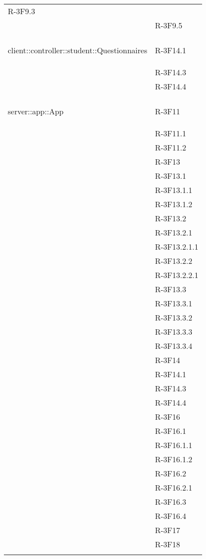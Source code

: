 \begin{longtable}{l p{3cm}}
	R-3F9.3 \tabularnewline &
	
	R-3F9.5 \tabularnewline &\tabularnewline
	\hline
	\hypertarget{client::controller::student::Questionnaires}{client::controller::student::Questionnaires} & R-3F14.1 \tabularnewline &
	
	R-3F14.3 \tabularnewline &
	
	R-3F14.4 \tabularnewline &\tabularnewline
	\hline
	\hypertarget{server::app::App}{server::app::App} & R-3F11 \tabularnewline &
	
	R-3F11.1 \tabularnewline &
	
	R-3F11.2 \tabularnewline &
	
	R-3F13 \tabularnewline &
	
	R-3F13.1 \tabularnewline &
	
	R-3F13.1.1 \tabularnewline &
	
	R-3F13.1.2 \tabularnewline &
	
	R-3F13.2 \tabularnewline &
	
	R-3F13.2.1 \tabularnewline &
	
	R-3F13.2.1.1 \tabularnewline &
	
	R-3F13.2.2 \tabularnewline &
	
	R-3F13.2.2.1 \tabularnewline &
	
	R-3F13.3 \tabularnewline &
	
	R-3F13.3.1 \tabularnewline &
	
	R-3F13.3.2 \tabularnewline &
	
	R-3F13.3.3 \tabularnewline &
	
	R-3F13.3.4 \tabularnewline &
	
	R-3F14 \tabularnewline &
	
	R-3F14.1 \tabularnewline &
	
	R-3F14.3 \tabularnewline &
	
	R-3F14.4 \tabularnewline &
	
	R-3F16 \tabularnewline &
	
	R-3F16.1 \tabularnewline &
	
	R-3F16.1.1 \tabularnewline &
	
	R-3F16.1.2 \tabularnewline &
	
	R-3F16.2 \tabularnewline &
	
	R-3F16.2.1 \tabularnewline &
	
	R-3F16.3 \tabularnewline &
	
	R-3F16.4 \tabularnewline &
	
	R-3F17 \tabularnewline &
	
	R-3F18 \tabularnewline &
	

\end{longtable}
